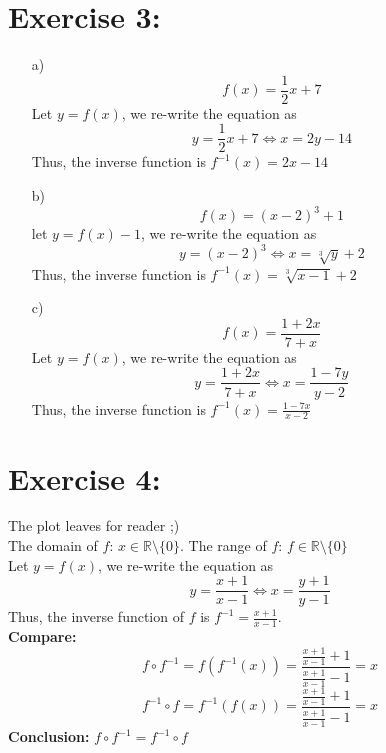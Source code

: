 \documentclass{article}
\newcommand{\R}{\mathbb{R}}
\begin{document}
	\section{Exercise 3:}
		\begin{enumerate}
			\item [a)]
				\begin{equation*}
					f(x) = \frac{1}{2}x + 7
				\end{equation*}
				Let $y = f(x)$, we re-write the equation as
				\begin{equation*}
					y = \frac{1}{2}x + 7 \iff x = 2y - 14
				\end{equation*}
				Thus, the inverse function is $f^{-1}(x) = 2x -14$
			\item[b)]
				\begin{equation*}
					f(x) = (x-2)^3 + 1
				\end{equation*}
				let $y = f(x)-1$, we re-write the equation as
				\begin{equation*}
					y = (x-2)^3 \iff x = \sqrt[3]{y} +2
				\end{equation*}
				Thus, the inverse function is $f^{-1}(x) = \sqrt[3]{x-1} +2$
			\item[c)]
				\begin{equation*}
					f(x) = \frac{1+2x}{7+x}
				\end{equation*}
				Let $y = f(x)$, we re-write the equation as
				\begin{equation*}
					y = \frac{1+2x}{7+x} \iff x = \frac{1-7y}{y-2}
				\end{equation*}
				Thus, the inverse function is $f^{-1}(x) = \frac{1-7x}{x-2}$
		\end{enumerate}
	
	\section{Exercise 4:}
		The plot leaves for reader ;)\\
		The domain of $f$: $ x \in \R \setminus \{0\}.$ The range of $f$: $f \in \R \setminus \{0\}$\\
		Let $y = f(x)$, we re-write the equation as
		\begin{equation*}
			y = \frac{x+1}{x-1} \iff x = \frac{y+1}{y-1}
		\end{equation*}
		Thus, the inverse function of $f$ is $f^{-1} = \frac{x+1}{x-1}$.\\
		\textbf{Compare:}
		\begin{equation*}
			f \circ f^{-1} =f(f^{-1}(x)) = \frac{\frac{x+1}{x-1} + 1}{\frac{x+1}{x-1}-1} = x
		\end{equation*}
		\begin{equation*}
			f^{-1} \circ f =f^{-1}(f(x)) = \frac{\frac{x+1}{x-1} + 1}{\frac{x+1}{x-1}-1} = x
		\end{equation*}
		\textbf{Conclusion:} $f \circ f^{-1} = f^{-1} \circ f$ 
		
\end{document}
